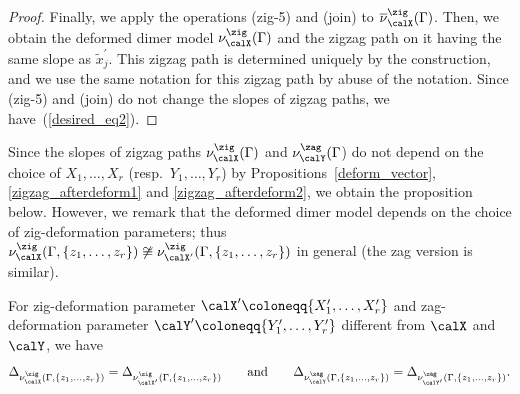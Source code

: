 \begin{proof}
Finally, we apply the operations (zig-5) and (join) to $\overline{\nu}_\calX^\zig(\Gamma)$.
Then, we obtain the deformed dimer model $\nu_\calX^\zig(\Gamma)$ and the zigzag path on it having the same slope as $\widetilde{x}^\prime_j$.
This zigzag path is determined uniquely by the construction, and we use the same notation for this zigzag path by abuse of the notation.
Since (zig-5) and (join) do not change the slopes of zigzag paths, we have~(\ref{desired_eq2}).
\end{proof}

Since the slopes of zigzag paths $\nu^\zig_\calX(\Gamma)$ and $\nu^\zag_\calY(\Gamma$) do not depend on
the choice of $X_1,\dots,X_r$ (resp.\ $Y_1,\dots,Y_r$) by Propositions~\ref{deform_vector}, \ref{zigzag_afterdeform1} and \ref{zigzag_afterdeform2},
we obtain the proposition below.
However, we remark that the deformed dimer model depends on the choice of zig-deformation parameters; thus $\nu^\zig_\calX(\Gamma,\{z_1,\dots,z_r\})\not\cong\nu^\zig_{\calX^\prime}(\Gamma,\{z_1,\dots,z_r\})$ in general (the zag version is similar).

\begin{Proposition}\label{other_weight_PMpolygon}
For zig-deformation parameter $\calX^\prime\coloneqq\{X_1^\prime,\dots,X_r^\prime\}$ and
zag-deformation parameter $\calY^\prime\coloneqq\{Y_1^\prime,\dots,Y_r^\prime\}$ different from $\calX$ and $\calY$, we have
\begin{displaymath}
\Delta_{\nu^\zig_\calX(\Gamma,\{z_1,\dots,z_r\})}=\Delta_{\nu^\zig_{\calX^\prime}(\Gamma,\{z_1,\dots,z_r\})}\qquad\text{and}\qquad \Delta_{\nu^\zag_\calY(\Gamma,\{z_1,\dots,z_r\})}=\Delta_{\nu^\zag_{\calY^\prime}(\Gamma,\{z_1,\dots,z_r\})}.
\end{displaymath}
\end{Proposition}
